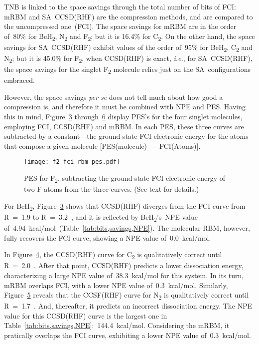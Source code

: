 \documentclass[%
 amsmath,amssymb,
 aps,prl, %
 reprint,%
]{revtex4-1}
\begin{document}
\indent TNB is linked to the space savings through the total number of bits of FCI: mRBM and SA~CCSD(RHF) are the compression methods, and are compared to the uncompressed one~(FCI). The space savings for mRBM are in the order of~80\% for BeH\textsubscript{2}, N\textsubscript{2} and F\textsubscript{2}; but it is 16.4\% for C\textsubscript{2}. On the other hand, the space savings for SA~CCSD(RHF) exhibit values of the order of~95\% for BeH\textsubscript{2}, C\textsubscript{2} and N\textsubscript{2}; but it is 45.0\% for F\textsubscript{2}, when CCSD(RHF) is exact, \emph{i.e.}, for SA~CCSD(RHF), the space savings for the singlet F\textsubscript{2} molecule relies just on the SA~configurations embraced.

\indent However, the space savings \emph{per se} does not tell much about how good a compression is, and therefore it must be combined with NPE and PES. Having this in mind, Figure~\hyperlink{fig:BeH2_PES}{{3}} through~\hyperlink{fig:F2_PES}{{6}} display PES's for the four singlet molecules, employing FCI, CCSD(RHF) and mRBM. In each PES, these three curves are subtracted by a constant---the ground-state FCI electronic energy for the atoms that compose a given molecule [PES(molecule)~$-$~FCI(Atoms)].

\begin{figure}[b!]
    \hypertarget{fig:F2_PES}{}
    \centering
    \texttt{[image: f2\_fci\_rbm\_pes.pdf]}
    \caption{PES for F\textsubscript{2}, subtracting the ground-state FCI electronic energy of two F atoms from the three curves. (See text for details.)}
\end{figure}

\indent For BeH\textsubscript{2}, Figure~\hyperlink{fig:BeH2_PES}{3} shows that CCSD(RHF) diverges from the FCI curve from R~=~1.9 to R~=~3.2~, and it is reflected by BeH\textsubscript{2}'s~NPE value of~4.94~kcal/mol~(Table~\ref{tab:bits,savings,NPE}). The molecular RBM, however, fully recovers the FCI curve, showing a NPE value of~0.0~kcal/mol.

\indent In Figure~\hyperlink{fig:C2_PES}{4}, the CCSD(RHF) curve for C\textsubscript{2} is qualitatively correct until R~=~2.0~. After that point, CCSD(RHF) predicts a lower dissociation energy, characterizing a large NPE value of~38.3~kcal/mol for this system. In its turn, mRBM overlaps FCI, with a lower NPE value of~0.3~kcal/mol. Similarly, Figure~\hyperlink{fig:N2_PES}{5} reveals that the CCSF(RHF) curve for N\textsubscript{2} is qualitatively correct until R~=~1.7~. And, thereafter, it predicts an incorrect dissociation energy. The NPE value for this CCSD(RHF) curve is the largest one in Table~\ref{tab:bits,savings,NPE}:~144.4~kcal/mol. Considering the mRBM, it pratically overlaps the FCI curve, exhibiting a lower NPE value of~0.3~kcal/mol.
\end{document}
